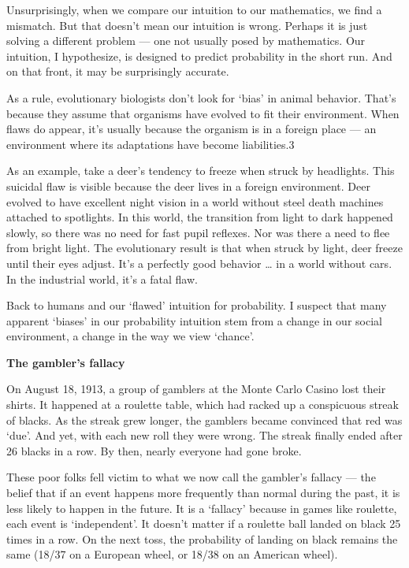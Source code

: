 \documentclass[
]{book}
\begin{document}
Unsurprisingly, when we compare our intuition to our mathematics, we find a mismatch. But that doesn't mean our intuition is wrong. Perhaps it is just solving a different problem --- one not usually posed by mathematics. Our intuition, I hypothesize, is designed to predict probability in the short run. And on that front, it may be surprisingly accurate.

As a rule, evolutionary biologists don't look for `bias' in animal behavior. That's because they assume that organisms have evolved to fit their environment. When flaws do appear, it's usually because the organism is in a foreign place --- an environment where its adaptations have become liabilities.3

As an example, take a deer's tendency to freeze when struck by headlights. This suicidal flaw is visible because the deer lives in a foreign environment. Deer evolved to have excellent night vision in a world without steel death machines attached to spotlights. In this world, the transition from light to dark happened slowly, so there was no need for fast pupil reflexes. Nor was there a need to flee from bright light. The evolutionary result is that when struck by light, deer freeze until their eyes adjust. It's a perfectly good behavior \ldots{} in a world without cars. In the industrial world, it's a fatal flaw.

Back to humans and our `flawed' intuition for probability. I suspect that many apparent `biases' in our probability intuition stem from a change in our social environment, a change in the way we view `chance'.

\textbf{The gambler's fallacy}

On August 18, 1913, a group of gamblers at the Monte Carlo Casino lost their shirts. It happened at a roulette table, which had racked up a conspicuous streak of blacks. As the streak grew longer, the gamblers became convinced that red was `due'. And yet, with each new roll they were wrong. The streak finally ended after 26 blacks in a row. By then, nearly everyone had gone broke.

These poor folks fell victim to what we now call the gambler's fallacy --- the belief that if an event happens more frequently than normal during the past, it is less likely to happen in the future. It is a `fallacy' because in games like roulette, each event is `independent'. It doesn't matter if a roulette ball landed on black 25 times in a row. On the next toss, the probability of landing on black remains the same (18/37 on a European wheel, or 18/38 on an American wheel).
\end{document}
